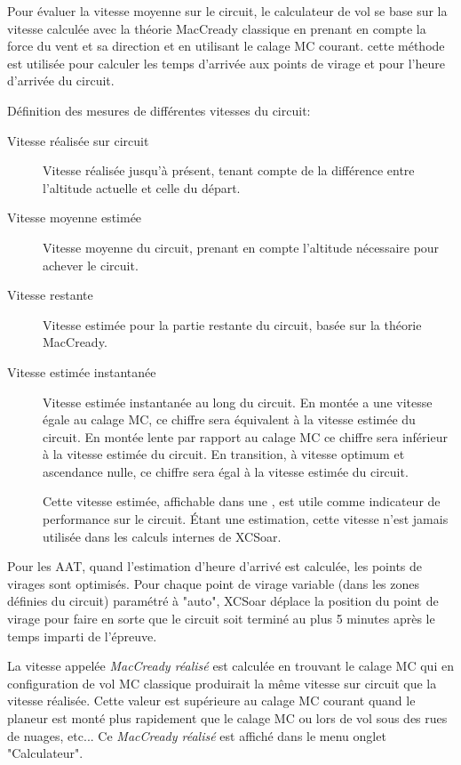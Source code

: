 Pour évaluer la vitesse moyenne sur le circuit, le calculateur de vol se base sur la vitesse calculée avec la théorie MacCready classique en prenant en compte la force du vent et sa direction et en utilisant le calage MC courant. cette méthode est utilisée pour calculer les temps d'arrivée aux points de virage et pour l'heure d'arrivée du circuit.

Définition des mesures de différentes vitesses du circuit:
\begin{description}
\item[Vitesse réalisée sur circuit]  Vitesse réalisée jusqu'à présent, tenant compte de la différence entre l'altitude actuelle et celle du départ.
\item[Vitesse moyenne estimée]  Vitesse moyenne du circuit, prenant en compte l'altitude nécessaire pour achever le circuit.
\item[Vitesse restante]  Vitesse estimée pour la partie restante du circuit, basée sur la théorie MacCready.
\item[Vitesse estimée instantanée]  Vitesse estimée instantanée au long du circuit. En montée a une vitesse égale au calage MC, ce chiffre sera équivalent à la vitesse estimée du circuit. En montée lente par rapport au calage MC ce chiffre sera inférieur à la vitesse estimée du circuit. En transition, à vitesse optimum et ascendance nulle, ce chiffre sera égal  à la vitesse estimée du circuit.

Cette vitesse estimée, affichable dans une {\InfoBox}, est utile comme indicateur de performance sur le circuit. Étant une estimation, cette vitesse n'est jamais utilisée dans les calculs internes de XCSoar.
\end{description}

Pour les AAT, quand l'estimation d'heure d'arrivé est calculée, les points de virages sont optimisés. \tip Pour chaque point de virage variable (dans les zones définies du circuit) paramétré à "auto", XCSoar déplace la position du point de virage pour faire en sorte que le circuit soit terminé au plus 5 minutes après le temps imparti de l'épreuve.

La vitesse appelée  {\em MacCready réalisé} est calculée en trouvant le calage MC qui en configuration de vol MC classique produirait la même vitesse sur circuit que la vitesse réalisée. Cette valeur est supérieure au calage MC courant quand le planeur est monté plus rapidement que le calage MC ou lors de vol sous des rues de nuages, etc... Ce {\em MacCready réalisé} est affiché dans le menu \blink{} onglet "Calculateur".

